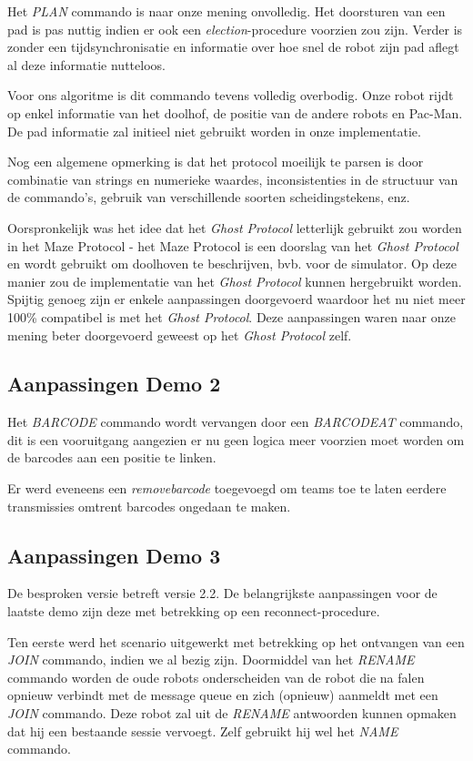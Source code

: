 \documentclass[12pt,a4paper]{report}
\begin{document}
Het \emph{PLAN} commando is naar onze mening onvolledig. Het doorsturen van een pad is pas nuttig indien er ook een \emph{election}-procedure voorzien zou zijn. Verder is zonder een tijdsynchronisatie en informatie over hoe snel de robot zijn pad aflegt al deze informatie nutteloos.

Voor ons algoritme is dit commando tevens volledig overbodig. Onze robot rijdt op enkel informatie van het doolhof, de positie van de andere robots en Pac-Man. De pad informatie zal initieel niet gebruikt worden in onze implementatie.

Nog een algemene opmerking is dat het protocol moeilijk te parsen is door combinatie van strings en numerieke waardes, inconsistenties in de structuur van de commando's, gebruik van verschillende soorten scheidingstekens, enz.

Oorspronkelijk was het idee dat het \emph{Ghost Protocol} letterlijk gebruikt zou worden in het Maze Protocol - het Maze Protocol is een doorslag van het \emph{Ghost Protocol} en wordt gebruikt om doolhoven te beschrijven, bvb. voor de simulator. Op deze manier zou de implementatie van het \emph{Ghost Protocol} kunnen hergebruikt worden. Spijtig genoeg zijn er enkele aanpassingen doorgevoerd waardoor het nu niet meer 100\% compatibel is met het \emph{Ghost Protocol}. Deze aanpassingen waren naar onze mening beter doorgevoerd geweest op het \emph{Ghost Protocol} zelf.

\subsection{Aanpassingen Demo 2}

Het \emph{BARCODE} commando wordt vervangen door een \emph{BARCODEAT} commando, dit is een vooruitgang aangezien er nu geen logica meer voorzien moet worden om de barcodes aan een positie te linken. 

Er werd eveneens een \emph{removebarcode} toegevoegd om teams toe te laten eerdere transmissies omtrent barcodes ongedaan te maken.

\subsection{Aanpassingen Demo 3}

De besproken versie betreft versie 2.2. De belangrijkste aanpassingen voor de laatste demo zijn deze met betrekking op een reconnect-procedure.

Ten eerste werd het scenario uitgewerkt met betrekking op het ontvangen van een \emph{JOIN} commando, indien we al bezig zijn. Doormiddel van het \emph{RENAME} commando worden de oude robots onderscheiden van de robot die na falen opnieuw verbindt met de message queue en zich (opnieuw) aanmeldt met een \emph{JOIN} commando. Deze robot zal uit de \emph{RENAME} antwoorden kunnen opmaken dat hij een bestaande sessie vervoegt. Zelf gebruikt hij wel het \emph{NAME} commando.
\end{document}
